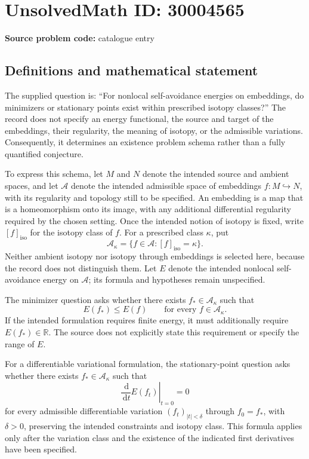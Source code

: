 \documentclass[11pt]{article}
\newcommand{\R}{\mathbb{R}}
\newcommand{\dd}{\,\mathrm{d}}
\begin{document}
\section*{UnsolvedMath ID: 30004565}
\textbf{Source problem code:} catalogue entry
\subsection{Definitions and mathematical statement}
The supplied question is: ``For nonlocal self-avoidance energies on embeddings, do minimizers or stationary points exist within prescribed isotopy classes?'' The record does not specify an energy functional, the source and target of the embeddings, their regularity, the meaning of isotopy, or the admissible variations. Consequently, it determines an existence problem schema rather than a fully quantified conjecture.

To express this schema, let \(M\) and \(N\) denote the intended source and ambient spaces, and let \(\mathcal A\) denote the intended admissible space of embeddings \(f\colon M\hookrightarrow N\), with its regularity and topology still to be specified. An embedding is a map that is a homeomorphism onto its image, with any additional differential regularity required by the chosen setting. Once the intended notion of isotopy is fixed, write \([f]_{\mathrm{iso}}\) for the isotopy class of \(f\). For a prescribed class \(\kappa\), put
\[
\mathcal A_\kappa=\{f\in\mathcal A:[f]_{\mathrm{iso}}=\kappa\}.
\]
Neither ambient isotopy nor isotopy through embeddings is selected here, because the record does not distinguish them. Let \(E\) denote the intended nonlocal self-avoidance energy on \(\mathcal A\); its formula and hypotheses remain unspecified.

The minimizer question asks whether there exists \(f_*\in\mathcal A_\kappa\) such that
\[
E(f_*)\leq E(f)\qquad\text{for every }f\in\mathcal A_\kappa.
\]
If the intended formulation requires finite energy, it must additionally require \(E(f_*)\in\R\). The source does not explicitly state this requirement or specify the range of \(E\).

For a differentiable variational formulation, the stationary-point question asks whether there exists \(f_*\in\mathcal A_\kappa\) such that
\[
\left.\frac{\dd}{\dd t}E(f_t)\right|_{t=0}=0
\]
for every admissible differentiable variation \((f_t)_{|t|<\delta}\) through \(f_0=f_*\), with \(\delta>0\), preserving the intended constraints and isotopy class. This formula applies only after the variation class and the existence of the indicated first derivatives have been specified.
\end{document}
